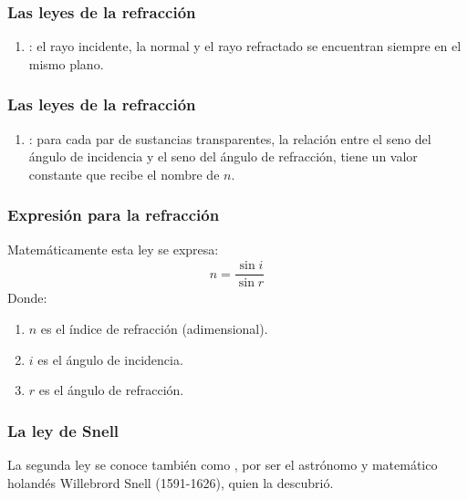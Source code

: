 \documentclass[14pt]{beamer}
\begin{document}
\begin{frame}
\frametitle{Las leyes de la refracción}
\begin{enumerate}[<+->]
\item {}: \pause el rayo incidente, la normal y el rayo refractado se encuentran siempre en el mismo plano.
\seti
\end{enumerate}
\end{frame}
\begin{frame}
\frametitle{Las leyes de la refracción}
\begin{enumerate}[<+->]
\conti
\item {}: \pause para cada par de sustancias transparentes, la relación entre el seno del ángulo de incidencia y el seno del ángulo de refracción, \pause tiene un valor constante que recibe el nombre de  $n$.
\end{enumerate}
\end{frame}
\begin{frame}
\frametitle{Expresión para la refracción}
Matemáticamente esta ley se expresa:
\pause
\begin{align*}
n = \dfrac{\sin i}{\sin r}
\end{align*}
Donde:
\begin{enumerate}[<+->]
\item $n$ es el índice de refracción (adimensional).
\item $i$ es el ángulo de incidencia.
\item $r$ es el ángulo de refracción.
\end{enumerate}
\end{frame}
\begin{frame}
\frametitle{La ley de Snell}
La segunda ley se conoce también como , \pause por ser el astrónomo y matemático holandés Willebrord Snell (1591-1626), quien la descubrió.
\end{frame}
\end{document}
